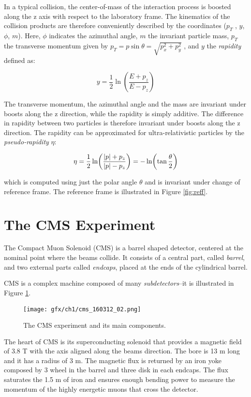 In a typical collision, the center-of-mass of the interaction process is boosted along the
z axis with respect to the laboratory frame. The kinematics of the collision products are
therefore conveniently described by the coordinates ($p_T$ , $y$, $\phi$, $m$). Here, $\phi$ indicates the
azimuthal angle, $m$ the invariant particle mass, $p_T$ the transverse momentum given by $p_T =
p\sin\theta = \sqrt{p_x^2 + p_y^2}$ , and $y$ the \emph{rapidity} defined as:

\begin{equation*}
    y = \frac{1}{2}\ln(\frac{E + p_z}{E - p_z})
\end{equation*}

The transverse momentum, the azimuthal angle and the mass are invariant under boosts
along the z direction, while the rapidity is simply additive. The difference in rapidity between two particles is therefore invariant under boosts along the z direction.
The rapidity can be approximated for ultra-relativistic particles by the \emph{pseudo-rapidity} $\eta$:

\begin{equation*}
    \eta = \frac{1}{2}\ln(\frac{\abs{p}+ p_z}{\abs{p} - p_z}) = -\ln(\tan\frac{\theta}{2}) 
\end{equation*}

which is computed using just the polar angle $\theta$ and is invariant under change of reference frame.
The reference frame is illustrated in Figure \ref{fig:reff}.

\section{The CMS Experiment}

The Compact Muon Solenoid (CMS) is a barrel shaped detector, centered at the
nominal point where the beams collide. It consists of a central part, called \emph{barrel},
and two external parts called \emph{endcaps}, placed at the ends of the cylindrical barrel.

CMS is a complex machine composed of many \emph{subdetectors}--it is illustrated in Figure \ref{fig:cms}.

\begin{figure}
    \centering
    \texttt{[image: gfx/ch1/cms\_160312\_02.png]}
    \caption[CMS]{The CMS experiment and its main components.}
    \label{fig:cms}
\end{figure}

The heart of CMS is its superconducting solenoid that provides a magnetic field of
3.8 T with the axis aligned along the beams direction. The bore is 13 m long and
it has a radius of 3 m. The magnetic flux is returned by an iron yoke composed by
3 wheel in the barrel and three disk in each endcaps. The flux saturates the 1.5 m
of iron and ensures enough bending power to measure the momentum of the highly energetic muons that
cross the detector.

